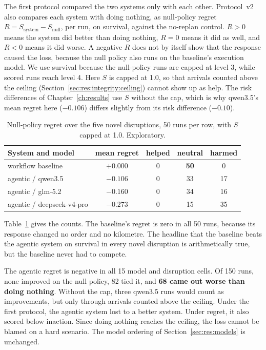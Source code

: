 The first protocol compared the two systems only with each other. Protocol~v2
also compares each system with doing nothing, as null-policy regret
$R = S_{\text{system}} - S_{\text{null}}$, per run, on survival, against the
no-replan control. $R > 0$ means the system did better than doing nothing,
$R = 0$ means it did as well, and $R < 0$ means it did worse. A negative $R$
does not by itself show that the response caused the loss, because the null
policy also runs on the baseline's execution model. We use
survival because the null-policy runs are capped at level 3, while scored runs
reach level 4. Here $S$ is capped at 1.0, so that arrivals counted above the
ceiling (Section~\ref{sec:res:integrity:ceiling}) cannot show up as help. The
risk differences of Chapter~\ref{ch:results} use $S$ without the cap, which is
why qwen3.5's mean regret here ($-0.106$) differs slightly from its risk
difference ($-0.10$).

\begin{table}[htbp]
\centering
\caption[Null-policy regret on the novel arm]{Null-policy regret over the five
novel disruptions, 50 runs per row, with $S$ capped at 1.0. Exploratory.}
\label{tab:crit:regret}
\small
\begin{tabular}{lcccc}
\toprule
System and model & mean regret & helped & neutral & harmed \\
\midrule
workflow baseline & $+0.000$ & 0 & \textbf{50} & 0 \\
agentic / qwen3.5 & $-0.106$ & 0 & 33 & 17 \\
agentic / glm-5.2 & $-0.160$ & 0 & 34 & 16 \\
agentic / deepseek-v4-pro & $-0.273$ & 0 & 15 & 35 \\
\bottomrule
\end{tabular}
\end{table}

Table~\ref{tab:crit:regret} gives the counts. The baseline's regret is zero in
all 50 runs, because its response changed no order and no kilometre. The
headline that the baseline beats the agentic system on survival in every
novel disruption is arithmetically true, but the baseline never had to compete.

The agentic regret is negative in all 15 model and disruption cells. Of 150
runs, none improved on the null policy, 82 tied it, and \textbf{68 came out
worse than doing nothing}. Without the cap, three qwen3.5 runs would count as
improvements, but only through arrivals counted above the ceiling. Under the
first protocol, the agentic system lost to a better system. Under regret, it
also scored below inaction. Since doing nothing reaches the ceiling, the loss
cannot be blamed on a hard scenario. The model ordering of
Section~\ref{sec:res:models} is unchanged.

